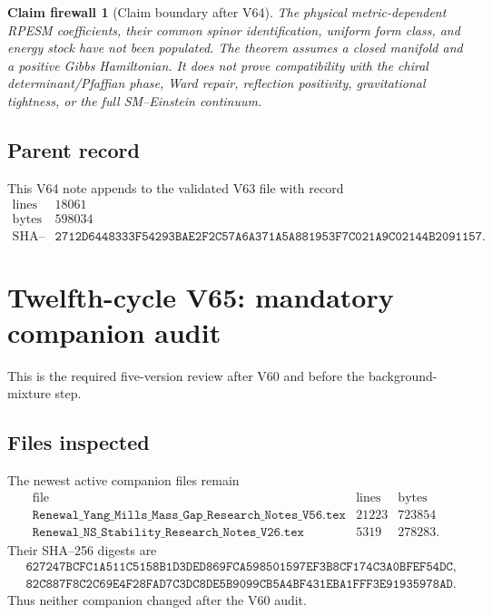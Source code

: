 \documentclass[11pt]{article}
\newtheorem{firewall}[theorem]{Claim firewall}
\theoremstyle{remark}
\begin{document}
\begin{firewall}[Claim boundary after V64]
\label{fire:v12v64-claim}
The physical metric-dependent RPESM coefficients, their common
spinor identification, uniform form class, and energy stock have not
been populated.  The theorem assumes a closed manifold and a
positive Gibbs Hamiltonian.  It does not prove compatibility with
the chiral determinant/Pfaffian phase, Ward repair, reflection
positivity, gravitational tightness, or the full SM--Einstein
continuum.
\end{firewall}

\subsection{Parent record}

This V64 note appends to the validated V63 file with record
\[
\begin{array}{c|c}
\text{lines}&18061\\
\text{bytes}&598034\\
\text{SHA--256}&
\texttt{2712D6448333F54293BAE2F2C57A6A371A5A881953F7C021A9C02144B2091157}.
\end{array}
\]


\section{Twelfth-cycle V65: mandatory companion audit}
\label{sec:v12v65}

This is the required five-version review after V60 and before the
background-mixture step.

\subsection{Files inspected}

The newest active companion files remain
\[
\begin{array}{c|r|r}
\text{file}&\text{lines}&\text{bytes}\\ \hline
\texttt{Renewal\_Yang\_Mills\_Mass\_Gap\_Research\_Notes\_V56.tex}
 &21223&723854\\
\texttt{Renewal\_NS\_Stability\_Research\_Notes\_V26.tex}
 &5319&278283.
\end{array}                                      \tag{65.1}
\]
Their SHA--256 digests are
\[
\begin{split}
 &\texttt{627247BCFC1A511C5158B1D3DED869FCA598501597EF3B8CF174C3A0BFEF54DC},\\
 &\texttt{82C887F8C2C69E4F28FAD7C3DC8DE5B9099CB5A4BF431EBA1FFF3E91935978AD}.
\end{split}                                      \tag{65.2}
\]
Thus neither companion changed after the V60 audit.
\end{document}
